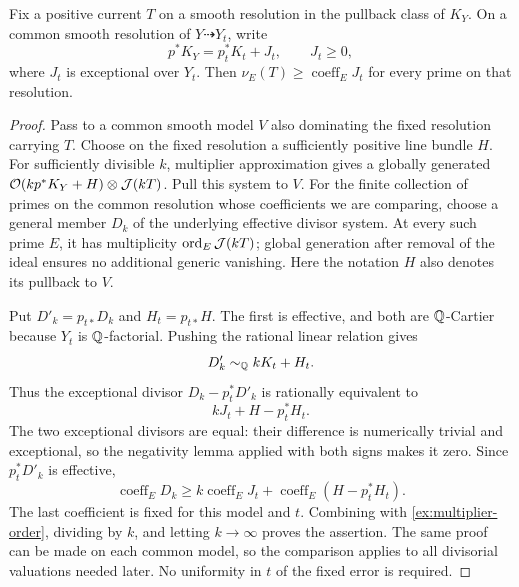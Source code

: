 \begin{lemma}\label{ex:current-comparison}
Fix a positive current \(T\) on a smooth resolution in the
pullback class of \(K_Y\). On a common smooth resolution of
\(Y\dashrightarrow Y_t\), write
\[
 p^*K_Y=p_t^*K_t+J_t,\qquad J_t\geq0,
\]
where \(J_t\) is exceptional over \(Y_t\).
Then \(\nu_E(T)\geq\operatorname{coeff}_E J_t\) for every
prime on that resolution.
\end{lemma}
\begin{proof}
Pass to a common smooth model \(V\) also dominating the
fixed resolution carrying \(T\). Choose on the fixed
resolution a sufficiently positive line bundle \(H\).
For sufficiently divisible \(k\), multiplier approximation
gives a globally generated
\(\mathcal{O}(kp^*K_Y+H)\otimes\mathcal J(kT)\).
Pull this system to \(V\). For the finite collection of primes
on the common resolution whose coefficients we are comparing,
choose a general member \(D_k\) of the underlying effective
divisor system. At every such prime \(E\), it has multiplicity
\(\operatorname{ord}_E\mathcal J(kT)\); global generation after removal
of the ideal ensures no additional generic vanishing.
Here the notation \(H\) also denotes its pullback to \(V\).

Put \(D'_k=p_{t*}D_k\) and \(H_t=p_{t*}H\). The first is
effective, and both are \(\mathbb{Q}\)-Cartier because \(Y_t\) is
\(\mathbb{Q}\)-factorial. Pushing the rational linear relation gives
\[
 D'_k\sim_{\mathbb{Q}} kK_t+H_t.
\]
Thus the exceptional divisor
\(D_k-p_t^*D'_k\) is rationally equivalent to
\[
 kJ_t+H-p_t^*H_t.
\]
The two exceptional divisors are equal: their difference is
numerically trivial and exceptional, so the negativity lemma
applied with both signs makes it zero. Since
\(p_t^*D'_k\) is effective,
\[
 \operatorname{coeff}_E D_k
 \geq k\operatorname{coeff}_E J_t
       +\operatorname{coeff}_E(H-p_t^*H_t).
 \]
The last coefficient is fixed for this model and \(t\).
Combining with \eqref{ex:multiplier-order}, dividing by
\(k\), and letting \(k\to\infty\) proves the assertion.
The same proof can be made on each common model, so the
comparison applies to all divisorial valuations needed
later. No uniformity in \(t\) of the fixed error is required.
\end{proof}

